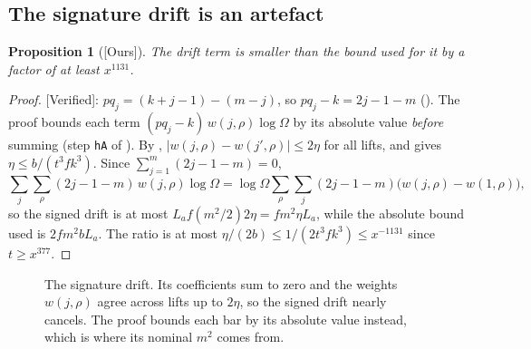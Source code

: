 \documentclass[11pt]{article}
\newcommand{\Verified}{\textcolor{verc}{\textsf{\small[Verified]}}}
\newcommand{\Ours}{\textcolor{oursc}{\textsf{\small[Ours]}}}
\theoremstyle{plain}
\newtheorem{proposition}[theorem]{Proposition}
\theoremstyle{definition}
\begin{document}
\subsection{The signature drift is an artefact}

\begin{proposition}[\Ours]\label{prop:drift}
The drift term is smaller than the bound used for it by a factor of at least $x^{1131}$.
\end{proposition}

\begin{proof}
\Verified: $pq_j=(k+j-1)-(m-j)$, so $pq_j-k=2j-1-m$ (). The proof bounds
each term $(pq_j-k)\,w(j,\rho)\log\Omega$ by its absolute value \emph{before} summing (step
\texttt{hA} of ). By ,
$|w(j,\rho)-w(j',\rho)|\le 2\eta$ for all lifts, and  gives
$\eta\le b/(t^3fk^3)$. Since $\sum_{j=1}^m(2j-1-m)=0$,
\[
\sum_j\sum_\rho(2j-1-m)\,w(j,\rho)\log\Omega=\log\Omega\sum_\rho\sum_j(2j-1-m)\bigl(w(j,\rho)-w(1,\rho)\bigr),
\]
so the signed drift is at most $L_a f(m^2/2)2\eta=fm^2\eta L_a$, while the absolute bound used is
$2fm^2bL_a$. The ratio is at most $\eta/(2b)\le 1/(2t^3fk^3)\le x^{-1131}$ since $t\ge x^{377}$.
\end{proof}

\begin{figure}[ht]
\centering
{}
\caption{The signature drift. Its coefficients sum to zero and the weights $w(j,\rho)$ agree across
lifts up to $2\eta$, so the signed drift nearly cancels. The proof bounds each bar by its absolute
value instead, which is where its nominal $m^2$ comes from.}\label{fig:drift}
\end{figure}
\end{document}
